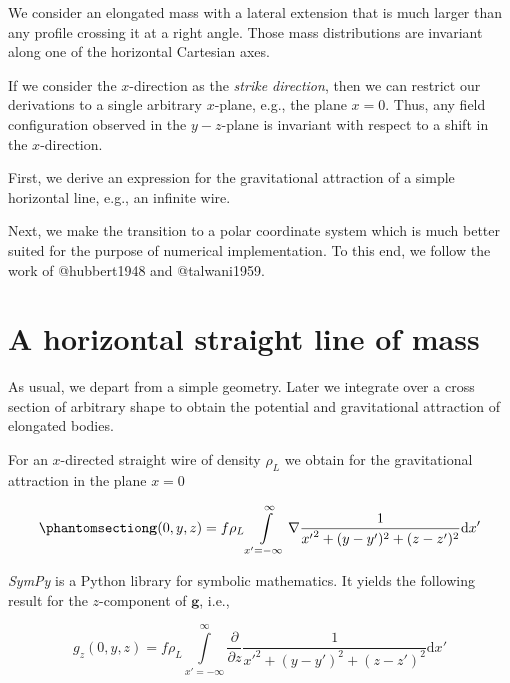 \documentclass[
  a4paper,
  DIV=11,
  numbers=noendperiod]{scrreprt}
\begin{document}
We consider an elongated mass with a lateral extension that is much
larger than any profile crossing it at a right angle. Those mass
distributions are invariant along one of the horizontal Cartesian axes.

If we consider the \(x\)-direction as the \emph{strike direction}, then
we can restrict our derivations to a single arbitrary \(x\)-plane, e.g.,
the plane \(x=0\). Thus, any field configuration observed in the
\(y-z\)-plane is invariant with respect to a shift in the
\(x\)-direction.

First, we derive an expression for the gravitational attraction of a
simple horizontal line, e.g., an infinite wire.

Next, we make the transition to a polar coordinate system which is much
better suited for the purpose of numerical implementation. To this end,
we follow the work of @hubbert1948 and @talwani1959.

\section{A horizontal straight line of
mass}\label{a-horizontal-straight-line-of-mass}

As usual, we depart from a simple geometry. Later we integrate over a
cross section of arbitrary shape to obtain the potential and
gravitational attraction of elongated bodies.

For an \(x\)-directed straight wire of density \(\rho_L\) we obtain for
the gravitational attraction in the plane \(x=0\)

\begin{equation}\phantomsection\label{eq-attraction-line}{
\mathbf g(0, y, z) = f \rho_L \int\limits_{x'=-\infty}^\infty \nabla \frac{1}{{x'}^2 + (y - y')^2 + (z - z')^2} \mathrm{d}x'
}\end{equation}

\emph{SymPy} is a Python library for symbolic mathematics. It yields the
following result for the \(z\)-component of \(\mathbf g\), i.e.,

\[
g_z(0, y, z) = f \rho_L \int\limits_{x'=-\infty}^\infty \frac{\partial}{\partial z} \frac{1}{{x'}^2 + (y - y')^2 + (z - z')^2} \mathrm{d}x'
\]
\end{document}
